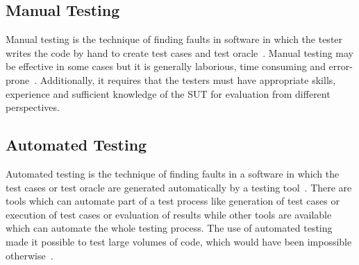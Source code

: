 


\subsection{Manual Testing}
Manual testing is the technique of finding faults in software in which the tester writes the code by hand to create test cases and test oracle~\cite{Ciupa2008}. Manual testing may be effective in some cases but it is generally laborious, time consuming and error-prone~\cite{tretmans1999}. Additionally, it requires that the testers must have appropriate skills, experience and sufficient knowledge of the SUT for evaluation from different perspectives.
 
\subsection{Automated Testing}
Automated testing is the technique of finding faults in a software in which the test cases or test oracle are generated automatically by a testing tool~\cite{Leitner2007}. There are tools which can automate part of a test process like generation of test cases or execution of test cases or evaluation of results while other tools are available which can automate the whole testing process. The use of automated testing made it possible to test large volumes of code, which would have been impossible otherwise~\cite{ramamoorthy1975}.

